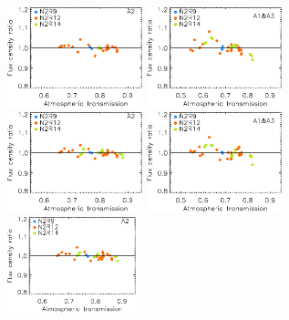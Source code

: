 \begin{figure}[ht!]
\begin{center}
    \includegraphics[clip=true, trim={0, -0.3cm, -0.3cm, 0}, width=0.35\textwidth]{Figures/Calibration/plot_flux_density_ratio_obstau_uranus_skydip_narrow_a2.pdf}
    \vspace{0.3cm}
    \includegraphics[clip=true, trim={0, -0.3cm, -0.3cm, 0}, width=0.35\textwidth]{Figures/Calibration/plot_flux_density_ratio_obstau_uranus_corrected_skydip_photocorr_demo_narrow_1mm.pdf}\hspace{0.2cm}
    \includegraphics[clip=true, trim={0, -0.3cm, -0.3cm, 0}, width=0.35\textwidth]{Figures/Calibration/plot_flux_density_ratio_obstau_uranus_corrected_skydip_photocorr_demo_narrow_a2.pdf}
    \vspace{0.3cm}
    \includegraphics[clip=true, width=0.35\textwidth]{Figures/Calibration/plot_flux_density_ratio_obstau_uranus_corrected_skydip_photocorr_pointing_narrow_1mm.pdf}\hspace{0.2cm}
    \includegraphics[clip=true, width=0.3337\textwidth]{Figures/Calibration/plot_flux_density_ratio_obstau_uranus_corrected_skydip_photocorr_pointing_narrow_a2.pdf}

\end{center}
\end{figure}
